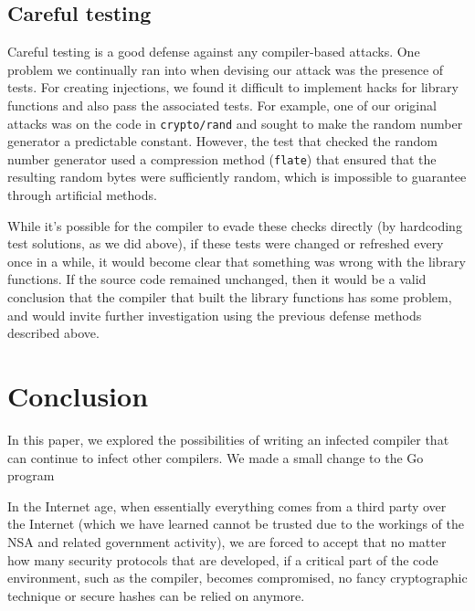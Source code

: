\documentclass[10pt]{sigplanconf}
\begin{document}
\subsection{Careful testing}

Careful testing is a good defense against any compiler-based attacks. One problem we continually ran into when devising our attack was the presence of tests. For creating injections, we found it difficult to implement hacks for library functions and also pass the associated tests. For example, one of our original attacks was on the code in \texttt{crypto/rand} and sought to make the random number generator a predictable constant. However, the test that checked the random number generator used a compression method (\texttt{flate}) that ensured that the resulting random bytes were sufficiently random, which is impossible to guarantee through artificial methods.

\smallskip

While it's possible for the compiler to evade these checks directly (by hardcoding test solutions, as we did above), if these tests were changed or refreshed every once in a while, it would become clear that something was wrong with the library functions. If the source code remained unchanged, then it would be a valid conclusion that the compiler that built the library functions has some problem, and would invite further investigation using the previous defense methods described above.

\section{Conclusion}

In this paper, we explored the possibilities of writing an infected compiler that can continue to infect other compilers. We made a small change to the Go program %

\smallskip

In the Internet age, when essentially everything comes from a third party over the Internet (which we have learned cannot be trusted due to the workings of the NSA and related government activity), we are forced to accept that no matter how many security protocols that are developed, if a critical part of the code environment, such as the compiler, becomes compromised, no fancy cryptographic technique or secure hashes can be relied on anymore.


\end{document}
